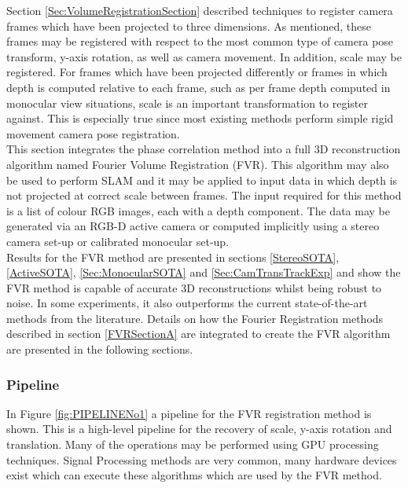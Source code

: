 
Section \ref{Sec:VolumeRegistrationSection} described techniques to register camera frames which have been projected to three dimensions. As mentioned, these frames may be registered with respect to the most common type of camera pose transform, y-axis rotation, as well as camera movement. In addition, scale may be registered. For frames which have been projected differently or frames in which depth is computed relative to each frame, such as per frame depth computed in monocular view situations, scale is an important transformation to register against. This is especially true since most existing methods perform simple rigid movement camera pose registration. \\

This section integrates the phase correlation method into a full 3D reconstruction algorithm named Fourier Volume Registration (FVR). This algorithm may also be used to perform SLAM and it may be applied to input data in which depth is not projected at correct scale between frames. The input required for this method is a list of colour RGB images, each with a depth component. The data may be generated via an RGB-D active camera or computed implicitly using a stereo camera set-up or calibrated monocular set-up. \\

Results for the FVR method are presented in sections \ref{StereoSOTA}, \ref{ActiveSOTA}, \ref{Sec:MonocularSOTA} and \ref{Sec:CamTransTrackExp} and show the FVR method is capable of accurate 3D reconstructions whilst being robust to noise. In some experiments, it also outperforms the current state-of-the-art methods from the literature. Details on how the Fourier Registration methods described in section \ref{FVRSectionA} are integrated to create the FVR algorithm are presented in the following sections. \\


\subsubsection{Pipeline}

\label{sec:FVRPipelineSect}

In Figure \ref{fig:PIPELINENo1} a pipeline for the FVR registration method is shown. This is a high-level pipeline for the recovery of scale, y-axis rotation and translation. Many of the operations may be performed using GPU processing techniques. Signal Processing methods are very common, many hardware devices exist which can execute these algorithms which are used by the FVR method. \\

